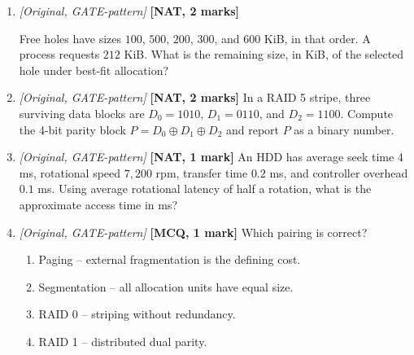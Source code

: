 \documentclass[11pt]{article}
\begin{document}
\begin{enumerate}
\item[\textbf{Q5}] \textit{[Original, GATE-pattern]} \textbf{[NAT, 2 marks]}
\begin{sloppypar}
Free holes have sizes $100$, $500$, $200$, $300$, and $600$ KiB, in that
order. A process requests $212$ KiB. What is the remaining size, in KiB, of
the selected hole under best-fit allocation?
\end{sloppypar}

\item[\textbf{Q6}] \textit{[Original, GATE-pattern]} \textbf{[NAT, 2 marks]}
In a RAID 5 stripe, three surviving data blocks are
$D_0=1010$, $D_1=0110$, and $D_2=1100$. Compute the 4-bit parity block
$P=D_0\mathbin{\mathop{\oplus}}D_1\mathbin{\mathop{\oplus}}D_2$ and report $P$
as a binary number.

\item[\textbf{Q7}] \textit{[Original, GATE-pattern]} \textbf{[NAT, 1 mark]}
An HDD has average seek time $4$ ms, rotational speed $7{,}200$ rpm, transfer
time $0.2$ ms, and controller overhead $0.1$ ms. Using average rotational
latency of half a rotation, what is the approximate access time in ms?

\item[\textbf{Q8}] \textit{[Original, GATE-pattern]} \textbf{[MCQ, 1 mark]}
Which pairing is correct?
\begin{enumerate}
  \item[(A)] Paging -- external fragmentation is the defining cost.
  \item[(B)] Segmentation -- all allocation units have equal size.
  \item[(C)] RAID 0 -- striping without redundancy.
  \item[(D)] RAID 1 -- distributed dual parity.
\end{enumerate}
\end{enumerate}
\end{document}
